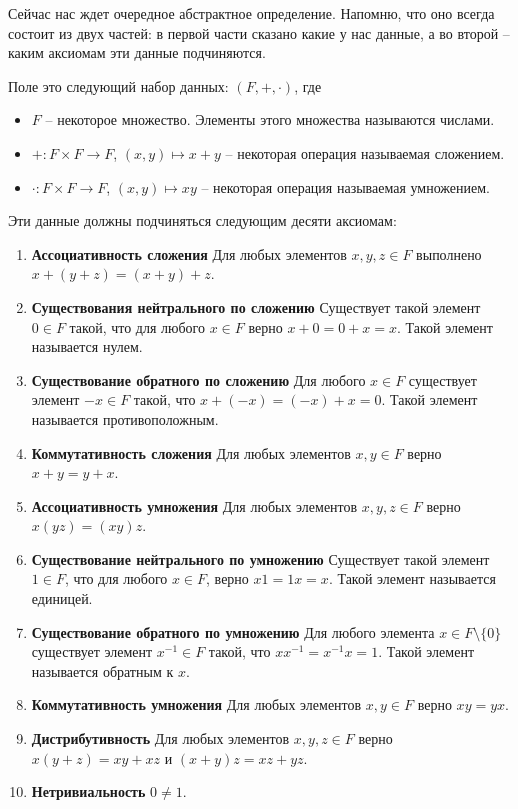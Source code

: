 Сейчас нас ждет очередное абстрактное определение.
Напомню, что оно всегда состоит из двух частей: в первой части сказано какие у нас данные, а во второй -- каким аксиомам эти данные подчиняются.

\begin{definition}
[Поле]
Поле это следующий набор данных: $(F, + , \cdot)$, где
\begin{itemize}
\item $F$ -- некоторое множество.
Элементы этого множества называются числами.

\item $+\colon F\times F\to F$, $(x,y)\mapsto x+y$ -- некоторая операция называемая сложением.

\item $\cdot\colon F\times F\to F$, $(x,y)\mapsto xy$ -- некоторая операция называемая умножением.
\end{itemize}
Эти данные должны подчиняться следующим десяти аксиомам:
\begin{enumerate}
\item {\bf Ассоциативность сложения}
Для любых элементов $x,y,z\in F$ выполнено $x+(y+z) = (x+y)+z$.

\item {\bf Существования нейтрального по сложению}
Существует такой элемент $0\in F$ такой, что для любого $x\in F$ верно $x + 0 = 0 + x = x$.
Такой элемент называется нулем.

\item {\bf Существование обратного по сложению}
Для любого $x\in F$ существует элемент $-x\in F$ такой, что $x + (-x) = (-x) + x = 0$.
Такой элемент называется противоположным.

\item {\bf Коммутативность сложения}
Для любых элементов $x,y\in F$ верно $x+y = y+x$.

\item {\bf Ассоциативность умножения}
Для любых элементов $x,y,z\in F$ верно $x(yz) = (xy)z$.

\item {\bf Существование нейтрального по умножению}
Существует такой элемент $1\in F$, что для любого $x\in F$, верно $x 1 = 1 x = x$.
Такой элемент называется единицей.

\item {\bf Существование обратного по умножению}
Для любого элемента $x\in F\setminus\{0\}$ существует элемент $x^{-1}\in F$ такой, что $x x^{-1} = x^{-1}x = 1$.
Такой элемент называется обратным к $x$.

\item {\bf Коммутативность умножения}
Для любых элементов $x,y\in F$ верно $xy = yx$.

\item {\bf Дистрибутивность}
Для любых элементов $x,y,z\in F$ верно $x(y+z) = xy + xz$ и $(x+y)z = xz + yz$.

\item {\bf Нетривиальность}
$0\neq 1$.
\end{enumerate}
\end{definition}


